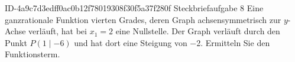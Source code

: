 \begin{exercise}
      {ID-4a9c7d3edff0ac0b12f78019308f30f5a37f280f}
      {Steckbriefaufgabe 8}
  \ifproblem\problem
    Eine ganzrationale Funktion vierten Grades, deren Graph
    achsensymmetrisch zur $y$-Achse verläuft, hat bei
    $x_1=\num{2}$ eine Nullstelle. Der Graph verläuft durch
    den Punkt $P(\num{1}\mid\num{-6})$ und hat dort eine
    Steigung von \num{-2}. Ermitteln Sie den Funktionsterm.
  \fi
\end{exercise}
